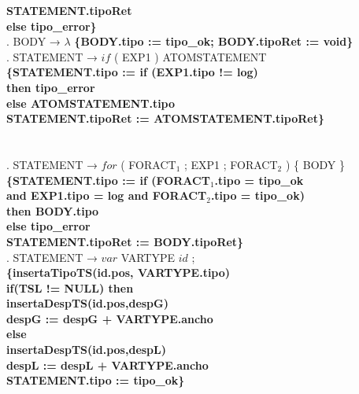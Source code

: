\begin{tabbing}
    \>                    \>           \>          \>\textbf{STATEMENT.tipoRet}\\
    \>                    \>           \>\textbf{else tipo\_error\}}\\
    . BODY → $\lambda$ \textbf{\{BODY.tipo := tipo\_ok; BODY.tipoRet := void\}}\\
    . STATEMENT → $if$ ( EXP1 ) ATOMSTATEMENT\\
    \>                    \> \textbf{\{STATEMENT.tipo := if (EXP1.tipo != log)}\\
    \>                    \> \> \>\textbf{then tipo\_error}\\
    \>                    \> \> \textbf{else ATOMSTATEMENT.tipo}\\
    \>                    \> \textbf{STATEMENT.tipoRet := ATOMSTATEMENT.tipoRet\}}\\
    \\
    \\
    . STATEMENT → $for$ ( FORACT$_1$ ; EXP1 ; FORACT$_2$ ) \{ BODY \}\\
    \>                    \> \textbf{\{STATEMENT.tipo := if (FORACT$_1$.tipo = tipo\_ok}\\
    \>                    \> \>\textbf{and EXP1.tipo = log and FORACT$_2$.tipo = tipo\_ok)}\\
    \>                    \> \> \>\textbf{then BODY.tipo}\\
    \>                    \> \>\textbf{else tipo\_error}\\
    \>                    \> \textbf{STATEMENT.tipoRet := BODY.tipoRet\}}\\
    . STATEMENT → $var$ VARTYPE $id$ ;\\
    \>                    \> \textbf{\{insertaTipoTS(id.pos, VARTYPE.tipo)}\\
    \>                    \> \textbf{ if(TSL != NULL) then }\\
    \>                    \> \> \textbf{insertaDespTS(id.pos,despG)}\\
    \>                    \> \> \textbf{despG := despG + VARTYPE.ancho}\\
    \>                    \> \textbf{else}\\
    \>                    \> \> \textbf{insertaDespTS(id.pos,despL)}\\
    \>                    \> \> \textbf{despL := despL + VARTYPE.ancho}\\
    \>                    \> \textbf{STATEMENT.tipo := tipo\_ok\}}\\

\end{tabbing}
